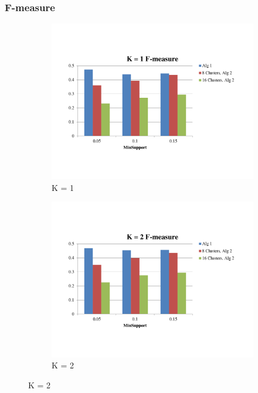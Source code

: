 \subsubsection{F-measure}
\begin{figure}
        \centering
        \begin{subfigure}[b]{0.4\textwidth}
         \includegraphics[width=\textwidth]{F-measure1}
         \caption{K = 1}
         \label{Fig:F-measure1}
        \end{subfigure}
        \begin{subfigure}[b]{0.4\textwidth}
         \includegraphics[width=\textwidth]{F-measure2}
         \caption{K = 2}

\end{subfigure}
\end{figure}
